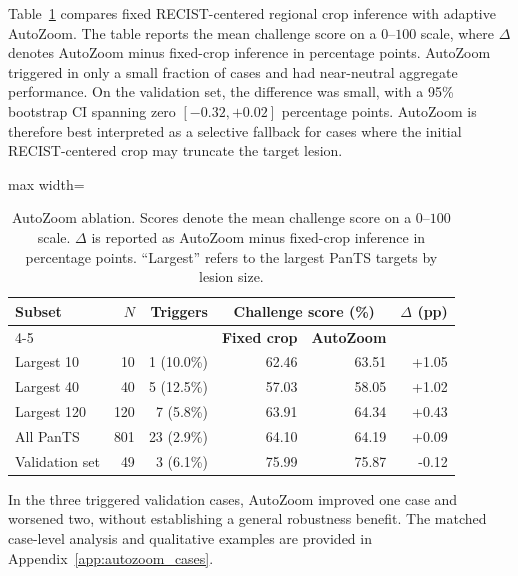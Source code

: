 Table~\ref{tab:autozoom_ablation} compares fixed RECIST-centered regional crop inference with adaptive AutoZoom. 
The table reports the mean challenge score on a \(0\)--\(100\) scale, where \(\Delta\) denotes AutoZoom minus fixed-crop inference in percentage points. 
AutoZoom triggered in only a small fraction of cases and had near-neutral aggregate performance. 
On the validation set, the difference was small, with a 95\% bootstrap CI spanning zero \([-0.32,+0.02]\) percentage points. 
AutoZoom is therefore best interpreted as a selective fallback for cases where the initial RECIST-centered crop may truncate the target lesion.

\begin{table}[htbp]
\centering
\caption{
AutoZoom ablation. 
Scores denote the mean challenge score on a \(0\)--\(100\) scale. 
\(\Delta\) is reported as AutoZoom minus fixed-crop inference in percentage points.
``Largest'' refers to the largest PanTS targets by lesion size.
}
\label{tab:autozoom_ablation}
\setlength{\tabcolsep}{5pt}
\renewcommand{\arraystretch}{1.05}
{\small
\begin{adjustbox}{max width=\linewidth}
\begin{tabular}{lrrrrr}
\toprule
\multirow{2}{*}{\textbf{Subset}} 
& \multirow{2}{*}{\textbf{\(N\)}} 
& \multirow{2}{*}{\textbf{Triggers}} 
& \multicolumn{2}{c}{\textbf{Challenge score (\%)}} 
& \multirow{2}{*}{\textbf{\(\Delta\) (pp)}} \\
\cmidrule(lr){4-5}
& & & \textbf{Fixed crop} & \textbf{AutoZoom} & \\
\midrule
Largest 10     & 10  & 1 \; (10.0\%) & 62.46 & 63.51 & +1.05 \\
Largest 40     & 40  & 5 \; (12.5\%) & 57.03 & 58.05 & +1.02 \\
Largest 120    & 120 & 7 \; (5.8\%)  & 63.91 & 64.34 & +0.43 \\
All PanTS      & 801 & 23 \; (2.9\%) & 64.10 & 64.19 & +0.09 \\
Validation set & 49  & 3 \; (6.1\%)  & 75.99 & 75.87 & -0.12 \\
\bottomrule
\end{tabular}
\end{adjustbox}
}
\end{table}

In the three triggered validation cases, AutoZoom improved one case and worsened two, without establishing a general robustness benefit. The matched case-level analysis and qualitative examples are provided in Appendix~\ref{app:autozoom_cases}.

